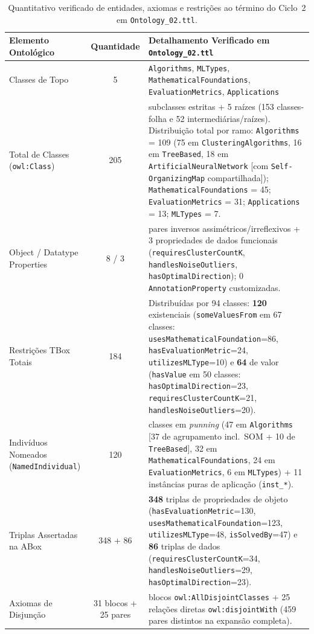 \documentclass[11pt,a4paper]{article}
\newcommand{\onto}[1]{\texttt{#1}}
\begin{document}
\begin{table}[htbp]
\centering
\caption{Quantitativo verificado de entidades, axiomas e restrições ao término do Ciclo~2 em \texttt{Ontology\_02.ttl}.}
\label{tab:metricas}
\footnotesize
\begin{tabularx}{\textwidth}{@{}p{4.3cm}c>{\raggedright\arraybackslash}X@{}}
\toprule
\textbf{Elemento Ontológico} & \textbf{Quantidade} & \textbf{Detalhamento Verificado em \texttt{Ontology\_02.ttl}} \\
\midrule
Classes de Topo & 5 & \onto{Algorithms}, \onto{MLTypes}, \onto{MathematicalFoundations}, \onto{EvaluationMetrics}, \onto{Applications} \\
\addlinespace[3pt]
Total de Classes (\onto{owl:Class}) & 205 & 200 subclasses estritas + 5 raízes (153 classes-folha e 52 intermediárias/raízes). Distribuição total por ramo: \onto{Algorithms} = 109 (75 em \onto{ClusteringAlgorithms}, 16 em \onto{TreeBased}, 18 em \onto{ArtificialNeuralNetwork} [com \onto{Self-OrganizingMap} compartilhada]); \onto{MathematicalFoundations} = 45; \onto{EvaluationMetrics} = 31; \onto{Applications} = 13; \onto{MLTypes} = 7. \\
\addlinespace[3pt]
Object / Datatype Properties & 8 / 3 & 4 pares inversos assimétricos/irreflexivos + 3 propriedades de dados funcionais (\onto{requiresClusterCountK}, \onto{handlesNoiseOutliers}, \onto{hasOptimalDirection}); 0 \onto{AnnotationProperty} customizadas. \\
\addlinespace[3pt]
Restrições TBox Totais & 184 & Distribuídas por 94 classes: \textbf{120} existenciais (\onto{someValuesFrom} em 67 classes: \onto{usesMathematicalFoundation}=86, \onto{hasEvaluationMetric}=24, \onto{utilizesMLType}=10) e \textbf{64} de valor (\onto{hasValue} em 50 classes: \onto{hasOptimalDirection}=23, \onto{requiresClusterCountK}=21, \onto{handlesNoiseOutliers}=20). \\
\addlinespace[3pt]
Indivíduos Nomeados (\onto{NamedIndividual}) & 120 & 109 classes em \emph{punning} (47 em \onto{Algorithms} [37 de agrupamento incl.\ SOM + 10 de \onto{TreeBased}], 32 em \onto{MathematicalFoundations}, 24 em \onto{EvaluationMetrics}, 6 em \onto{MLTypes}) + 11 instâncias puras de aplicação (\onto{inst\_*}). \\
\addlinespace[3pt]
Triplas Assertadas na ABox & 348 + 86 & \textbf{348} triplas de propriedades de objeto (\onto{hasEvaluationMetric}=130, \onto{usesMathematicalFoundation}=123, \onto{utilizesMLType}=48, \onto{isSolvedBy}=47) e \textbf{86} triplas de dados (\onto{requiresClusterCountK}=34, \onto{handlesNoiseOutliers}=29, \onto{hasOptimalDirection}=23). \\
\addlinespace[3pt]
Axiomas de Disjunção & 31 blocos + 25 pares & 31 blocos \onto{owl:AllDisjointClasses} + 25 relações diretas \onto{owl:disjointWith} (459 pares distintos na expansão completa). \\
\bottomrule
\end{tabularx}
\end{table}
\end{document}
